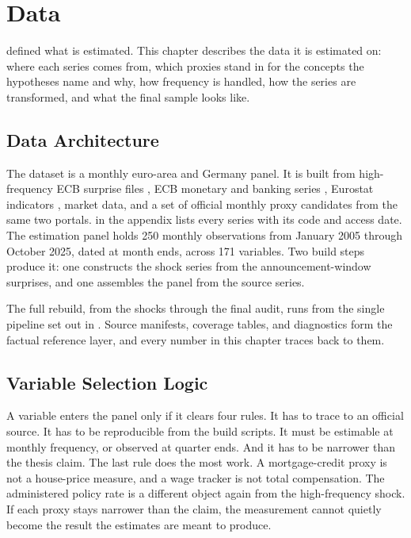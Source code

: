 \chapter{Data}
\label{chap:data}

 defined what is estimated. This chapter describes the data it is estimated on: where each series comes from, which proxies stand in for the concepts the hypotheses name and why, how frequency is handled, how the series are transformed, and what the final sample looks like.

\section{Data Architecture}

The dataset is a monthly euro-area and Germany panel. It is built from high-frequency ECB surprise files \parencite{ECBEAMPD,RagusaFactors}, ECB monetary and banking series \parencite{ECBDataPortal}, Eurostat indicators \parencite{EurostatDatabase}, market data, and a set of official monthly proxy candidates from the same two portals.  in the appendix lists every series with its code and access date. The estimation panel holds 250 monthly observations from January 2005 through October 2025, dated at month ends, across 171 variables. Two build steps produce it: one constructs the shock series from the announcement-window surprises, and one assembles the panel from the source series.

The full rebuild, from the shocks through the final audit, runs from the single pipeline set out in . Source manifests, coverage tables, and diagnostics form the factual reference layer, and every number in this chapter traces back to them.

\section{Variable Selection Logic}

A variable enters the panel only if it clears four rules. It has to trace to an official source. It has to be reproducible from the build scripts. It must be estimable at monthly frequency, or observed at quarter ends. And it has to be narrower than the thesis claim. The last rule does the most work. A mortgage-credit proxy is not a house-price measure, and a wage tracker is not total compensation. The administered policy rate is a different object again from the high-frequency shock. If each proxy stays narrower than the claim, the measurement cannot quietly become the result the estimates are meant to produce.

